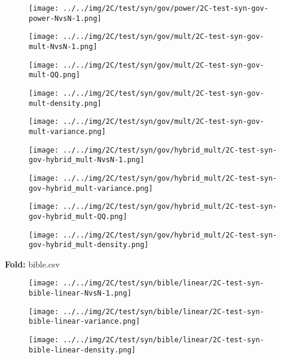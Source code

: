 \begin{figure}[H]
\centering	\texttt{[image: ../../img/2C/test/syn/gov/power/2C-test-syn-gov-power-NvsN-1.png]}
\end{figure}
\begin{figure}[H]
\centering	\texttt{[image: ../../img/2C/test/syn/gov/mult/2C-test-syn-gov-mult-NvsN-1.png]}
\end{figure}
\begin{figure}[H]
\centering	\texttt{[image: ../../img/2C/test/syn/gov/mult/2C-test-syn-gov-mult-QQ.png]}
\end{figure}
\begin{figure}[H]
\centering	\texttt{[image: ../../img/2C/test/syn/gov/mult/2C-test-syn-gov-mult-density.png]}
\end{figure}
\begin{figure}[H]
\centering	\texttt{[image: ../../img/2C/test/syn/gov/mult/2C-test-syn-gov-mult-variance.png]}
\end{figure}
\begin{figure}[H]
\centering	\texttt{[image: ../../img/2C/test/syn/gov/hybrid\_mult/2C-test-syn-gov-hybrid\_mult-NvsN-1.png]}
\end{figure}
\begin{figure}[H]
\centering	\texttt{[image: ../../img/2C/test/syn/gov/hybrid\_mult/2C-test-syn-gov-hybrid\_mult-variance.png]}
\end{figure}
\begin{figure}[H]
\centering	\texttt{[image: ../../img/2C/test/syn/gov/hybrid\_mult/2C-test-syn-gov-hybrid\_mult-QQ.png]}
\end{figure}
\begin{figure}[H]
\centering	\texttt{[image: ../../img/2C/test/syn/gov/hybrid\_mult/2C-test-syn-gov-hybrid\_mult-density.png]}
\end{figure}
\textbf{Fold:} bible.csv
\begin{figure}[H]
\centering	\texttt{[image: ../../img/2C/test/syn/bible/linear/2C-test-syn-bible-linear-NvsN-1.png]}
\end{figure}
\begin{figure}[H]
\centering	\texttt{[image: ../../img/2C/test/syn/bible/linear/2C-test-syn-bible-linear-variance.png]}
\end{figure}
\begin{figure}[H]
\centering	\texttt{[image: ../../img/2C/test/syn/bible/linear/2C-test-syn-bible-linear-density.png]}
\end{figure}
